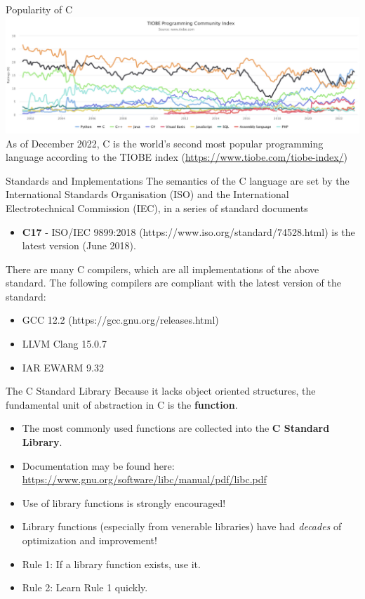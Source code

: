 \documentclass[11pt]{beamer}
\begin{document}
\begin{frame}{Popularity of C}
\includegraphics[scale=0.24]{tiobe.png} \\
As of December 2022, C is the world's second most popular programming language according to the TIOBE index (\url{https://www.tiobe.com/tiobe-index/})
\end{frame}

\begin{frame}{Standards and Implementations}
The semantics of the C language are set by the International Standards Organisation (ISO) and the International Electrotechnical Commission (IEC), in a series of standard documents
\begin{itemize}
\item \textbf{C17} - ISO/IEC 9899:2018 (https://www.iso.org/standard/74528.html) is the latest version (June 2018).
\end{itemize}
There are many C compilers, which are all implementations of the above standard.  The following compilers are compliant with the latest version of the standard:
\begin{itemize}
\item GCC 12.2 (https://gcc.gnu.org/releases.html)
\item LLVM Clang 15.0.7
\item IAR EWARM 9.32
\end{itemize}
\end{frame}

\begin{frame}{The C Standard Library}
Because it lacks object oriented structures, the fundamental unit of abstraction in C is the \textbf{function}. 
\begin{itemize}
\item The most commonly used functions are collected into the \textbf{C Standard Library}.
\item Documentation may be found here: \url{https://www.gnu.org/software/libc/manual/pdf/libc.pdf}
\item Use of library functions is strongly encouraged!  
\item Library functions (especially from venerable libraries) have had \emph{decades} of optimization and improvement!  
\item Rule 1: If a library function exists, use it.
\item Rule 2: Learn Rule 1 quickly.  
\end{itemize}
\end{frame}
\end{document}

